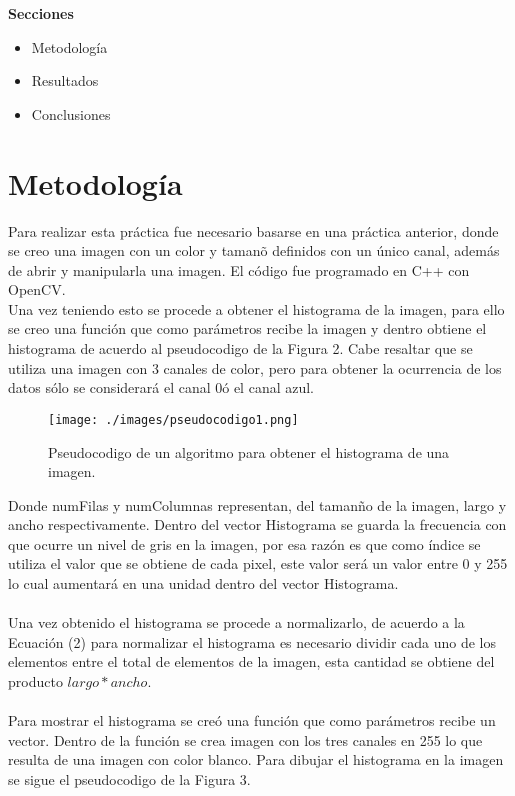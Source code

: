 \documentclass[conference]{IEEEtran}
\begin{document}
\textbf{Secciones}
\begin{itemize}
    \item Metodolog\'ia
    \item Resultados
    \item Conclusiones
\end{itemize}

\section{Metodolog\'ia}
Para realizar esta pr\'actica fue necesario basarse en una pr\'actica anterior, donde se creo una imagen con un color y taman\~o definidos con un \'unico canal, adem\'as de abrir y manipularla una imagen. El c\'odigo fue programado en C++ con OpenCV.\\
Una vez teniendo esto se procede a obtener el histograma de la imagen, para ello se creo una funci\'on que como par\'ametros recibe la imagen y dentro obtiene el histograma de acuerdo al pseudocodigo de la Figura 2. Cabe resaltar que se utiliza una imagen con 3 canales de color, pero para obtener la ocurrencia de los datos s\'olo se considerar\'a el canal 0\'o el canal azul.\\

\begin{figure}[h]
	\begin{center}
		\setlength{\unitlength}{0.00105in}
		\texttt{[image: ./images/pseudocodigo1.png]}
	\end{center}
	\caption{Pseudocodigo de un algoritmo para obtener el histograma de una imagen.}
\end{figure}

Donde numFilas y numColumnas representan, del taman\~no de la imagen, largo y ancho respectivamente. Dentro del vector Histograma se guarda la frecuencia con que ocurre un nivel de gris en la imagen, por esa raz\'on es que como \'indice se utiliza el valor que se obtiene de cada pixel, este valor ser\'a un valor entre 0 y 255 lo cual aumentar\'a en una unidad dentro del vector Histograma.\\\\
Una vez obtenido el histograma se procede a normalizarlo, de acuerdo a la Ecuaci\'on (2) para normalizar el histograma es necesario dividir cada uno de los elementos entre el total de elementos de la imagen, esta cantidad se obtiene del producto $largo*ancho$. \\\\
Para mostrar el histograma se cre\'o una funci\'on que como par\'ametros recibe un vector. Dentro de la funci\'on se crea imagen con los tres canales en 255 lo que resulta de una imagen con color blanco. Para dibujar el histograma en la imagen se sigue el pseudocodigo de la Figura 3.\\
\end{document}
